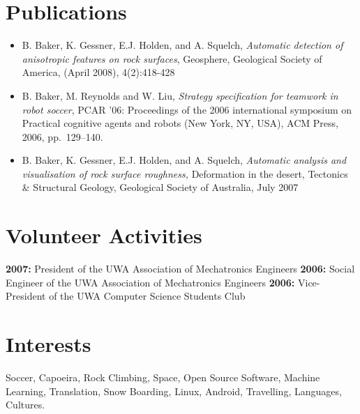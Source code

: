 \documentclass[10pt, a4paper]{report}
\begin{document}
\vfill

\section*{Publications}
\begin{itemize}
\item B. Baker, K. Gessner, E.J. Holden, and A. Squelch,  \emph{Automatic detection of anisotropic features on
rock surfaces}, Geosphere, Geological Society of America, (April 2008), 4(2):418-428
\item B. Baker, M. Reynolds and W. Liu, \emph{Strategy specification for
  teamwork in robot soccer}, PCAR '06: Proceedings of the 2006 international
  symposium on Practical cognitive agents and robots (New York, NY, USA), ACM
  Press, 2006, pp.~129--140.
\item B. Baker, K. Gessner, E.J. Holden, and A. Squelch, \emph{Automatic analysis and 
visualisation of rock surface roughness,} Deformation in the desert, Tectonics \& Structural Geology, Geological Society of Australia, July 
2007
\end{itemize}

%


\vfill

\section*{Volunteer Activities}
{\bf 2007:} President of the UWA Association of Mechatronics Engineers \newline
{\bf 2006:} Social Engineer of the UWA Association of Mechatronics Engineers \newline
{\bf 2006:} Vice-President of the UWA Computer Science Students Club \newline


\vfill

\section*{Interests}
{ Soccer, Capoeira, Rock Climbing, Space, Open Source Software, Machine Learning, Translation, Snow Boarding, Linux, Android, Travelling, Languages, Cultures.}
\end{document}
